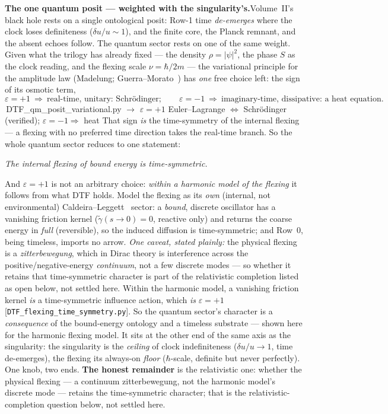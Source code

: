 \documentclass[11pt]{article}
\newcommand{\pychip}[2]{{\footnotesize\colorbox{cbPyBg}{\ttfamily\,#1\,}\,{\color{gray}$\to$ #2}}}
\begin{document}
\textbf{The one quantum posit --- weighted with the singularity's.}\enspace Volume~II's black hole rests on
a single ontological posit: Row-1 time \emph{de-emerges} where the clock loses definiteness
($\delta u/u\sim1$), and the finite core, the Planck remnant, and the absent echoes follow. The quantum
sector rests on one of the same weight. Given what the trilogy has already fixed --- the density
$\rho=|\psi|^2$, the phase $S$ as the clock reading, and the flexing scale $\nu=\hbar/2m$ --- the
variational principle for the amplitude law (Madelung; Guerra--Morato~\cite{GuerraMorato1983}) has
\emph{one} free choice left: the sign of its osmotic term,
\[ \varepsilon=+1\ \Rightarrow\ \text{real-time, unitary: Schr\"odinger};\qquad
   \varepsilon=-1\ \Rightarrow\ \text{imaginary-time, dissipative: a heat equation}. \]
\pychip{DTF\_qm\_posit\_variational.py}{$\varepsilon{=}{+}1$ Euler--Lagrange $\Leftrightarrow$ Schr\"odinger (verified); $\varepsilon{=}{-}1\Rightarrow$ heat}
That sign \emph{is} the time-symmetry of the internal flexing --- a flexing with no preferred time
direction takes the real-time branch. So the whole quantum sector reduces to one statement:
\begin{center}\itshape The internal flexing of bound energy is time-symmetric.\end{center}
\noindent And $\varepsilon=+1$ is not an arbitrary choice: \emph{within a harmonic model of the flexing} it
follows from what DTF holds. Model the flexing as its \emph{own} (internal, not environmental)
Caldeira--Leggett~\cite{CaldeiraLeggett1983} sector: a \emph{bound}, discrete oscillator has a vanishing
friction kernel ($\tilde\gamma(s\!\to\!0)=0$, reactive only) and returns the coarse energy in \emph{full}
(reversible), so the induced diffusion is time-symmetric; and Row~0, being timeless, imports no arrow.
\emph{One caveat, stated plainly:} the physical flexing is a \emph{zitterbewegung}, which in Dirac theory
is interference across the positive/negative-energy \emph{continuum}, not a few discrete modes --- so
whether it retains that time-symmetric character is part of the relativistic completion listed as open
below, not settled here. Within the harmonic model, a vanishing friction kernel \emph{is} a
time-symmetric influence action, which \emph{is} $\varepsilon=+1$
[\texttt{DTF\_flexing\_time\_symmetry.py}]. So the quantum sector's character is a \emph{consequence} of the
bound-energy ontology and a timeless substrate --- shown here for the harmonic flexing model. It sits at the
other end of the same axis as the singularity: the singularity is the \emph{ceiling} of clock indefiniteness
($\delta u/u\to1$, time de-emerges), the flexing its always-on \emph{floor} ($\hbar$-scale, definite but
never perfectly). One knob, two ends. \textbf{The honest remainder} is the relativistic one: whether the
physical flexing --- a continuum zitterbewegung, not the harmonic model's discrete mode --- retains the
time-symmetric character; that is the relativistic-completion question below, not settled here.
\end{document}
